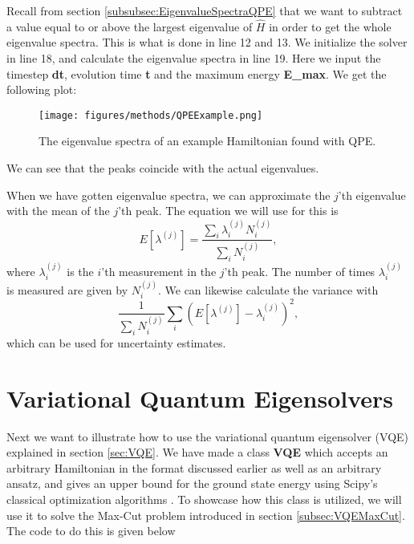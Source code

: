 Recall from section \ref{subsubsec:EigenvalueSpectraQPE} that we want to subtract a value equal to or above the largest eigenvalue of $\hat{H}$ in order to get the whole eigenvalue spectra. This is what is done in line 12 and 13. We initialize the solver in line 18, and calculate the eigenvalue spectra in line 19. Here we input the timestep \textbf{dt}, evolution time \textbf{t} and the maximum energy \textbf{E\_max}.
We get the following plot:
\begin{figure}[H]
    \centering
    \texttt{[image: figures/methods/QPEExample.png]}
    \caption{The eigenvalue spectra of an example Hamiltonian found with QPE.}
    \label{fig:QPEExample}
\end{figure}
We can see that the peaks coincide with the actual eigenvalues.

\bigskip 

When we have gotten eigenvalue spectra, we can approximate the $j$'th eigenvalue with the mean of the $j$'th peak. The equation we will use for this is
\begin{equation}
    \label{eq:QPEMeanPeak}
     E[\lambda^{(j)}] = \frac{\sum_i \lambda^{(j)}_i N^{(j)}_i}{\sum_i N^{(j)}_i}, 
\end{equation}
where $\lambda^{(j)}_i$ is the $i$'th measurement in the $j$'th peak. The number of times $\lambda^{(j)}_i$ is measured are given by $N^{(j)}_i$.
We can likewise calculate the variance with
\begin{equation}
    \label{eq:QPEVarPeak}
    \frac{1}{\sum_i N^{(j)}_i} \sum_i (E[\lambda^{(j)}] - \lambda^{(j)}_i)^2,
\end{equation}
which can be used for uncertainty estimates.



\section{Variational Quantum Eigensolvers}
\label{sec:MethodsVQE}
Next we want to illustrate how to use the variational quantum eigensolver (VQE) explained in section \ref{sec:VQE}.
We have made a class \textbf{VQE} which accepts an arbitrary Hamiltonian in the format discussed earlier as well as an arbitrary ansatz, and gives an upper bound for the ground state energy using Scipy's \cite{ScipyOptimizeMinimize} classical optimization algorithms . To showcase how this class is utilized, we will use it to solve the Max-Cut problem introduced in section \ref{subsec:VQEMaxCut}. The code to do this is given below

